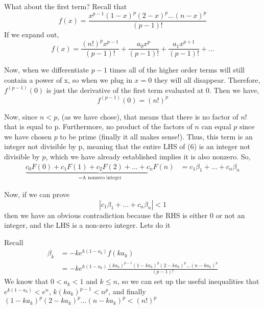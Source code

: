 \documentclass{article}
\begin{document}
What about the first term? Recall that
\begin{equation*}
        f(x)=\frac{x^{p-1}(1-x)^p(2-x)^p...(n-x)^p}{(p-1)!}
\end{equation*}
  If we expand out,
\begin{equation*}
    f(x)=\frac{(n!)^px^{p-1}}{(p-1)!}+\frac{a_0x^{p}}{(p-1)!}+\frac{a_1x^{p+1}}{(p-1)!}+...
\end{equation*} \par
Now, when we differentiate $p-1$ times all of the higher order terms will still contain a power of x, so when we plug in $x=0$ they will all disappear. Therefore, $f^{(p-1)}(0)$ is just the derivative of the first term evaluated at 0. Then we have,
\begin{equation*}
    f^{(p-1)}(0)=(n!)^p
\end{equation*} \par
Now, since $n<p$, (as we have chose), that means that there is no factor of $n!$ that is equal to p. Furthermore, no product of the factors of $n$ can equal $p$ since we have chosen $p$ to be prime (finally it all makes sense!). Thus, this term is an integer not divisible by p, meaning that the entire LHS of (6) is an integer not divisible by $p$, which we have already established implies it is also nonzero. So,
\begin{equation*}
    \begin{split}
        \underbrace{c_0F(0)+c_{1}F(1)+c_2F(2)+...+c_{n}F(n)}_{=\text{A nonzero integer}}&=c_{1}\beta_{1}+...+c_{n}\beta_{n}
    \end{split}
\end{equation*}
\par Now, if we can prove 
\begin{equation*}
    \left|c_{1}\beta_{1}+...+c_{n}\beta_{n}\right|<1
\end{equation*}
then we have an obvious contradiction because the RHS is either 0 or not an integer, and the LHS is a non-zero integer. Lets do it \par Recall
\begin{equation*}
    \begin{split}
        \beta_k&=-ke^{k(1-a_k)}f(ka_k) \\
        &=-ke^{k(1-a_k)}\frac{(ka_k)^{p-1}(1-ka_k)^p(2-ka_k)^p...(n-ka_k)^p}{(p-1)!}
    \end{split}
\end{equation*}
  We know that $0<a_k<1$ and $k\leq n$, so we can set up the useful inequalities that $e^{k(1-a_k)}<e^n$, $k(ka_k)^{p-1}<n^p$, and finally $(1-ka_k)^p(2-ka_k)^p...(n-ka_k)^p<(n!)^p$ \par
\end{document}
